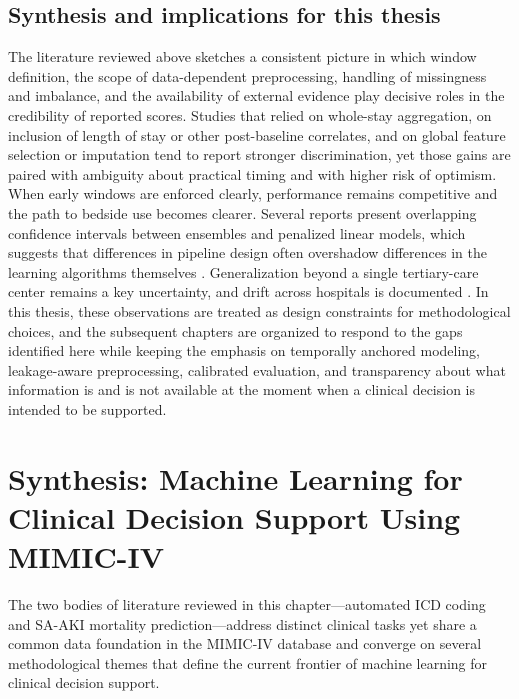 \subsection{Synthesis and implications for this thesis}
The literature reviewed above sketches a consistent picture in which window definition, the scope of data-dependent preprocessing, handling of missingness and imbalance, and the availability of external evidence play decisive roles in the credibility of reported scores. Studies that relied on whole-stay aggregation, on inclusion of length of stay or other post-baseline correlates, and on global feature selection or imputation tend to report stronger discrimination, yet those gains are paired with ambiguity about practical timing and with higher risk of optimism. When early windows are enforced clearly, performance remains competitive and the path to bedside use becomes clearer. Several reports present overlapping confidence intervals between ensembles and penalized linear models, which suggests that differences in pipeline design often overshadow differences in the learning algorithms themselves \citep{Kang_Yoon_2023}. Generalization beyond a single tertiary-care center remains a key uncertainty, and drift across hospitals is documented \citep{Johnson_2023_MIMIC,Rockenschaub_2024}. In this thesis, these observations are treated as design constraints for methodological choices, and the subsequent chapters are organized to respond to the gaps identified here while keeping the emphasis on temporally anchored modeling, leakage-aware preprocessing, calibrated evaluation, and transparency about what information is and is not available at the moment when a clinical decision is intended to be supported.

\section{Synthesis: Machine Learning for Clinical Decision Support Using MIMIC-IV}\label{sec:lit-synthesis}

The two bodies of literature reviewed in this chapter---automated ICD coding and SA-AKI mortality prediction---address distinct clinical tasks yet share a common data foundation in the MIMIC-IV database and converge on several methodological themes that define the current frontier of machine learning for clinical decision support.

